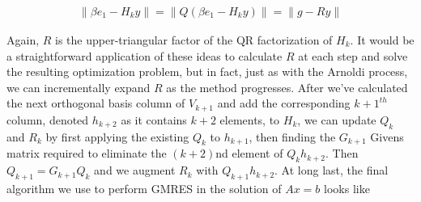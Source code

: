 \documentclass[11pt]{article}
\begin{document}
\begin{align*}
  \| \beta e_1 - H_k y \| = \| Q(\beta e_1 - H_k y) \| = \| g - R y \|
\end{align*}

Again, $R$ is the upper-triangular factor of the QR factorization of $H_k$. It would be a straightforward application of these ideas to calculate $R$ at each step and solve the resulting optimization problem, but in fact, just as with the Arnoldi process, we can incrementally expand $R$ as the method progresses. After we've calculated the next orthogonal basis column of $V_{k+1}$ and add the corresponding $k+1^{th}$ column, denoted $h_{k+2}$ as it contains $k+2$ elements, to $H_k$, we can update $Q_k$ and $R_k$ by first applying the existing $Q_k$ to $h_{k+1}$, then finding the $G_{k+1}$ Givens matrix required to eliminate the $(k + 2)$nd element of $Q_k h_{k+2}$. Then $Q_{k+1} = G_{k+1} Q_k$ and we augment $R_k$ with $Q_{k+1} h_{k+2}$. At long last, the final algorithm we use to perform GMRES in the solution of $Ax = b$ looks like
\end{document}
